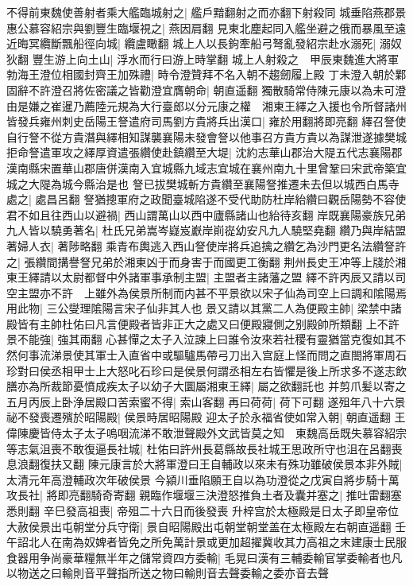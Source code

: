 不得前東魏使善射者乘大艦臨城射之|{
	艦戶黯翻射之而亦翻下射殺同}
城垂陷燕郡景惠公慕容紹宗與劉豐生臨堰視之|{
	燕因肩翻}
見東北塵起同入艦坐避之俄而暴風至遠近晦冥纜斷飄船徑向城|{
	纜盧瞰翻}
城上人以長鉤牽船弓弩亂發紹宗赴水溺死|{
	溺奴狄翻}
豐生游上向土山|{
	浮水而行曰游上時掌翻}
城上人射殺之　甲辰東魏進大將軍勃海王澄位相國封齊王加殊禮|{
	時令澄贊拜不名入朝不趨劒履上殿}
丁未澄入朝於鄴固辭不許澄召將佐密議之皆勸澄宜膺朝命|{
	朝直遥翻}
獨散騎常侍陳元康以為未可澄由是嫌之崔暹乃薦陸元規為大行臺郎以分元康之權　湘東王繹之入援也令所督諸州皆發兵雍州刺史岳陽王詧遣府司馬劉方貴將兵出漢口|{
	雍於用翻將即亮翻}
繹召詧使自行詧不從方貴潛與繹相知謀襲襄陽未發會詧以他事召方貴方貴以為謀泄遂據樊城拒命詧遣軍攻之繹厚資遣張纘使赴鎮纘至大堤|{
	沈約志華山郡治大隄五代志襄陽郡漢南縣宋置華山郡唐併漢南入宜城縣九域志宜城在襄州南九十里曾鞏曰宋武帝築宜城之大隄為城今縣治是也}
詧已拔樊城斬方貴纘至襄陽詧推遷未去但以城西白馬寺處之|{
	處昌呂翻}
詧猶摠軍府之政聞臺城陷遂不受代助防杜岸紿纘曰觀岳陽勢不容使君不如且往西山以避禍|{
	西山謂萬山以西中廬縣諸山也紿待亥翻}
岸既襄陽豪族兄弟九人皆以驍勇著名|{
	杜氏兄弟嵩岑嶷岌巚岸崱嵸幼安凡九人驍堅堯翻}
纘乃與岸結盟著婦人衣|{
	著陟略翻}
乘青布輿逃入西山詧使岸將兵追擒之纘乞為沙門更名法纘詧許之|{
	張纘間搆譽詧兄弟於湘東凶于而身害于而國更工衡翻}
荆州長史王冲等上牋於湘東王繹請以太尉都督中外諸軍事承制主盟|{
	主盟者主諸藩之盟}
繹不許丙辰又請以司空主盟亦不許　上雖外為侯景所制而内甚不平景欲以宋子仙為司空上曰調和隂陽焉用此物|{
	三公燮理隂陽言宋子仙非其人也}
景又請以其黨二人為便殿主帥|{
	梁禁中諸殿皆有主帥杜佑曰凡言便殿者皆非正大之處又曰便殿寢側之别殿帥所類翻}
上不許景不能強|{
	強其兩翻}
心甚憚之太子入泣諫上曰誰令汝來若社稷有靈猶當克復如其不然何事流涕景使其軍士入直省中或驅驢馬帶弓刀出入宫庭上怪而問之直閤將軍周石珍對曰侯丞相甲士上大怒叱石珍曰是侯景何謂丞相左右皆懼是後上所求多不遂志飲膳亦為所裁節憂憤成疾太子以幼子大圜屬湘東王繹|{
	屬之欲翻託也}
并剪爪髪以寄之五月丙辰上卧浄居殿口苦索蜜不得|{
	索山客翻}
再曰荷荷|{
	荷下可翻}
遂殂年八十六景祕不發喪遷殯於昭陽殿|{
	侯景時居昭陽殿}
迎太子於永福省使如常入朝|{
	朝直遥翻}
王偉陳慶皆侍太子太子嗚咽流涕不敢泄聲殿外文武皆莫之知　東魏高岳既失慕容紹宗等志氣沮喪不敢復逼長社城|{
	杜佑曰許州長葛縣故長社城王思政所守也沮在呂翻喪息浪翻復扶又翻}
陳元康言於大將軍澄曰王自輔政以來未有殊功雖破侯景本非外賊|{
	太清元年高澄輔政次年破侯景}
今潁川垂陷願王自以為功澄從之戊寅自將步騎十萬攻長社|{
	將即亮翻騎奇寄翻}
親臨作堰堰三決澄怒推負土者及囊并塞之|{
	推吐雷翻塞悉則翻}
辛巳發高祖喪|{
	帝殂二十六日而後發喪}
升梓宫於太極殿是日太子即皇帝位大赦侯景出屯朝堂分兵守衛|{
	景自昭陽殿出屯朝堂朝堂盖在太極殿左右朝直遥翻}
壬午詔北人在南為奴婢者皆免之所免萬計景或更加超擢冀收其力高祖之末建康士民服食器用争尚豪華糧無半年之儲常資四方委輸|{
	毛晃曰漢有三輔委輸官掌委輸者也凡以物送之曰輸則音平聲指所送之物曰輸則音去聲委輸之委亦音去聲}
